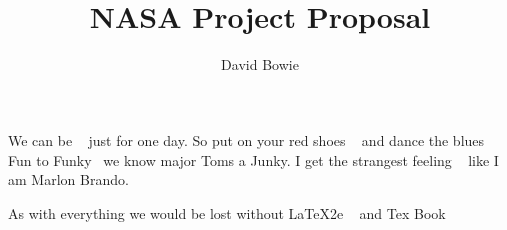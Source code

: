 \documentclass[12pt,twoside]{article}
\title{\textbf{\doctitle}\\
NASA Project Proposal}
\author{David Bowie}
\begin{document}
\thispagestyle{empty}

\maketitle

We can be ~\cite{Heroes,Changes} just for one day.
So put on your red shoes ~\cite{Dance} and dance the blues
Fun to Funky~\cite{Ashes} we know major Toms a Junky.
I get the strangest feeling ~\cite{China} like I am Marlon Brando.

As with everything we would be lost without LaTeX2e ~\cite{LaTeX2e} and Tex Book ~\cite{TeX-book}

\end{document}
